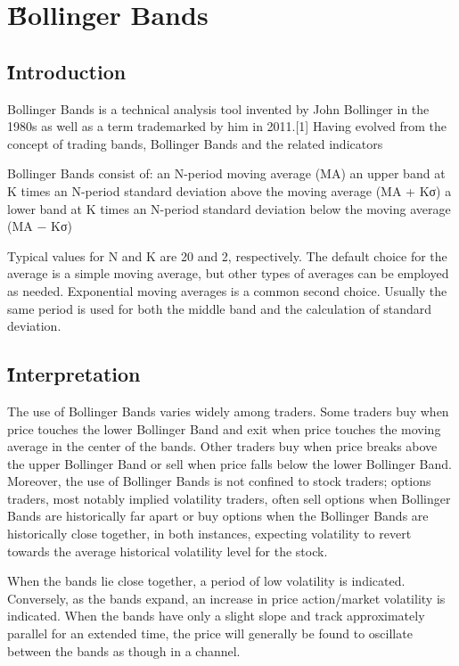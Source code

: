 \documentclass[12pt]{article}
\begin{document}
\section{\H Bollinger Bands}
\subsection{\H Introduction}
Bollinger Bands is a technical analysis tool invented by John Bollinger in the 1980s as well as a term trademarked by him in 2011.[1] Having evolved from the concept of trading bands, Bollinger Bands and the related indicators %

Bollinger Bands consist of:
an N-period moving average (MA)
an upper band at K times an N-period standard deviation above the moving average (MA + Kσ)
a lower band at K times an N-period standard deviation below the moving average (MA − Kσ)

Typical values for N and K are 20 and 2, respectively. The default choice for the average is a simple moving average, but other types of averages can be employed as needed. Exponential moving averages is a common second choice. Usually the same period is used for both the middle band and the calculation of standard deviation.

\subsection{\H Interpretation}
The use of Bollinger Bands varies widely among traders. Some traders buy when price touches the lower Bollinger Band and exit when price touches the moving average in the center of the bands. Other traders buy when price breaks above the upper Bollinger Band or sell when price falls below the lower Bollinger Band. Moreover, the use of Bollinger Bands is not confined to stock traders; options traders, most notably implied volatility traders, often sell options when Bollinger Bands are historically far apart or buy options when the Bollinger Bands are historically close together, in both instances, expecting volatility to revert towards the average historical volatility level for the stock.

When the bands lie close together, a period of low volatility is indicated. Conversely, as the bands expand, an increase in price action/market volatility is indicated. When the bands have only a slight slope and track approximately parallel for an extended time, the price will generally be found to oscillate between the bands as though in a channel.
\end{document}
